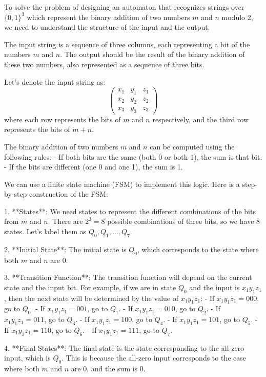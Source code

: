 To solve the problem of designing an automaton that recognizes strings over \(\{0,1\}^3\) which represent the binary addition of two numbers \(m\) and \(n\) modulo 2, we need to understand the structure of the input and the output.

The input string is a sequence of three columns, each representing a bit of the numbers \(m\) and \(n\). The output should be the result of the binary addition of these two numbers, also represented as a sequence of three bits.

Let's denote the input string as:
\[ \begin{pmatrix} x_1 & y_1 & z_1 \\ x_2 & y_2 & z_2 \\ x_3 & y_3 & z_3 \end{pmatrix} \]
where each row represents the bits of \(m\) and \(n\) respectively, and the third row represents the bits of \(m + n\).

The binary addition of two numbers \(m\) and \(n\) can be computed using the following rules:
- If both bits are the same (both 0 or both 1), the sum is that bit.
- If the bits are different (one 0 and one 1), the sum is 1.

We can use a finite state machine (FSM) to implement this logic. Here is a step-by-step construction of the FSM:

1. **States**: We need states to represent the different combinations of the bits from \(m\) and \(n\). There are \(2^3 = 8\) possible combinations of three bits, so we have 8 states. Let's label them as \(Q_0, Q_1, \ldots, Q_7\).

2. **Initial State**: The initial state is \(Q_0\), which corresponds to the state where both \(m\) and \(n\) are 0.

3. **Transition Function**: The transition function will depend on the current state and the input bit. For example, if we are in state \(Q_0\) and the input is \(x_1y_1z_1\), then the next state will be determined by the value of \(x_1y_1z_1\):
   - If \(x_1y_1z_1 = 000\), go to \(Q_0\).
   - If \(x_1y_1z_1 = 001\), go to \(Q_1\).
   - If \(x_1y_1z_1 = 010\), go to \(Q_2\).
   - If \(x_1y_1z_1 = 011\), go to \(Q_3\).
   - If \(x_1y_1z_1 = 100\), go to \(Q_4\).
   - If \(x_1y_1z_1 = 101\), go to \(Q_5\).
   - If \(x_1y_1z_1 = 110\), go to \(Q_6\).
   - If \(x_1y_1z_1 = 111\), go to \(Q_7\).

4. **Final States**: The final state is the state corresponding to the all-zero input, which is \(Q_0\). This is because the all-zero input corresponds to the case where both \(m\) and \(n\) are 0, and the sum is 0.

